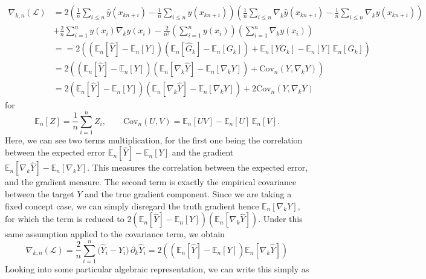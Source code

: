 \documentclass[10pt]{article}
\begin{document}
\begin{align}
\nabla_{k,n}(\mathcal{L})
&= 2\left(\frac{1}{n}\sum_{i\le n}\hat{y}(x_{kn+i}) - \frac{1}{n}\sum_{i\le n}y(x_{kn+i})\right)
   \left(\frac{1}{n}\sum_{i\le n}\nabla_k\hat{y}(x_{kn+i}) - \frac{1}{n}\sum_{i\le n}\nabla_k y(x_{kn+i})\right) \\
&+ \frac{2}{n}\sum_{i=1}^n y(x_i)\nabla_k y(x_i)
   - \frac{2}{n^2}\left(\sum_{i=1}^n y(x_i)\right)\left(\sum_{i=1}^n \nabla_k y(x_i)\right)\\
   & = = 2 \left(
   \left( \mathbb{E}_n[\hat{Y}] - \mathbb{E}_n[Y] \right)
   \left( \mathbb{E}_n[\hat{G}_k] - \mathbb{E}_n[G_k] \right)
   + \mathbb{E}_n[Y G_k] - \mathbb{E}_n[Y] \,\mathbb{E}_n[G_k]
\right)\\
&= 2 \left( 
   \left( \mathbb{E}_n[\hat{Y}] - \mathbb{E}_n[Y] \right)
   \left( \mathbb{E}_n[\nabla_k \hat{Y}] - \mathbb{E}_n[\nabla_k Y] \right)
   + \mathrm{Cov}_n\!\left(Y, \nabla_k Y\right)
\right) \\
& = 2 
   \left( \mathbb{E}_n[\hat{Y}] - \mathbb{E}_n[Y] \right)
   \left( \mathbb{E}_n[\nabla_k \hat{Y}] - \mathbb{E}_n[\nabla_k Y] \right) + 2\mathrm{Cov}_n\!\left(Y, \nabla_k Y\right)
\end{align}
for 
\begin{equation}
    \mathbb{E}_n[Z] = \frac{1}{n} \sum_{i=1}^n Z_i,
\qquad
\mathrm{Cov}_n(U,V) = \mathbb{E}_n[UV] - \mathbb{E}_n[U] \,\mathbb{E}_n[V].
\end{equation}
Here, we can see two terms multiplication, for the first one being the correlation between the expected error $\mathbb{E}_n[\hat{Y}] - \mathbb{E}_n[Y]$ and the gradient $\mathbb{E}_n[\nabla_k \hat{Y}] - \mathbb{E}_n[\nabla_k Y]$. This measures the correlation between the expected error, and the gradient measure. The second term is exactly the empirical covariance between the target $Y$ and the true gradient component. Since we are taking a fixed concept case, we can simply disregard the truth gradient hence $\mathbb{E}_n[\nabla_k Y]$, for which the term is reduced to $2\left( \mathbb{E}_n[\hat{Y}] - \mathbb{E}_n[Y] \right) \left( \mathbb{E}_n[\nabla_k \hat{Y}] \right)$. Under this same assumption applied to the covariance term, we obtain
\begin{equation}
    \nabla_{k,n}(\mathcal{L})
= \frac{2}{n}\sum_{i=1}^n \big(\hat Y_i - Y_i\big)\,\partial_k \hat Y_i = 2\left(
   \left( \mathbb{E}_n[\hat{Y}] - \mathbb{E}_n[Y] \right)
   \mathbb{E}_n[\nabla_k \hat{Y}]
\right)
\end{equation}
Looking into some particular algebraic representation, we can write this simply as
\end{document}
